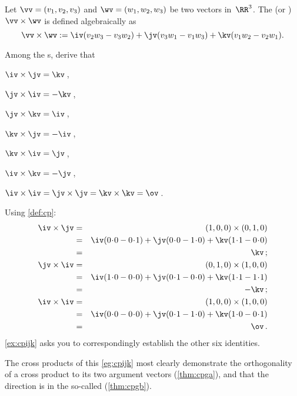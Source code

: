 \begin{definition} \label{def:cp}
Let \(\vv=(v_1,v_2,v_3)\) and \(\wv=(w_1,w_2,w_3)\) be two vectors in~\(\RR^3\).
The   (or ) \(\vv\times\wv\) is defined algebraically as
\begin{equation*}
\vv\times\wv:=\iv(v_2w_3-v_3w_2)
+\jv(v_3w_1-v_1w_3)
+\kv(v_1w_2-v_2w_1).
\end{equation*}
\end{definition}



\begin{example} \label{eg:cpijk}
Among the s, derive that 
\begin{parts}
\item \(\iv\times\jv=\kv\)\,, \item \(\jv\times\iv=-\kv\)\,,
\item \(\jv\times\kv=\iv\)\,, \item \(\kv\times\jv=-\iv\)\,,
\item \(\kv\times\iv=\jv\)\,, \item \(\iv\times\kv=-\jv\)\,,
\item \(\iv\times\iv=\jv\times\jv=\kv\times\kv=\ov\)\,.
\end{parts}
\begin{solution} Using \autoref{def:cp}:
\begin{eqnarray*}
\iv\times\jv&=&(1,0,0)\times(0,1,0)
\\&=&\iv(0\cdot0-0\cdot1)
+\jv(0\cdot0-1\cdot0)
+\kv(1\cdot1-0\cdot0)
\\&=&\kv\,;
\\\jv\times\iv&=&(0,1,0)\times(1,0,0)
\\&=&\iv(1\cdot0-0\cdot0)
+\jv(0\cdot1-0\cdot0)
+\kv(1\cdot1-1\cdot1)
\\&=&-\kv\,;
\\\iv\times\iv&=&(1,0,0)\times(1,0,0)
\\&=&\iv(0\cdot0-0\cdot0)
+\jv(0\cdot1-1\cdot0)
+\kv(1\cdot0-0\cdot1)
\\&=&\ov\,.
\end{eqnarray*}
\autoref{ex:cpijk} asks you to correspondingly establish the other six identities.
\end{solution}
The cross products of this \autoref{eg:cpijk} most clearly demonstrate the orthogonality of a cross product to its two argument vectors (\autoref{thm:cpga}), and that the direction is in the so-called  (\autoref{thm:cpgb}).
\end{example}




